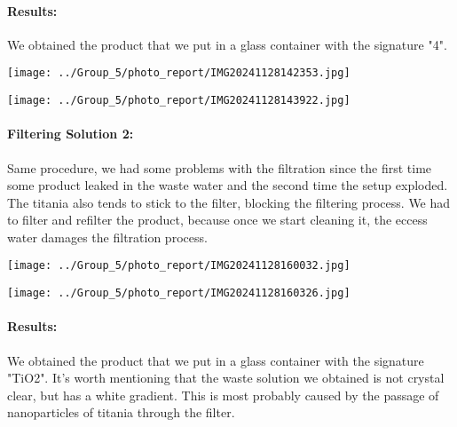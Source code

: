 \newpage

\paragraph{Results: } We obtained the product that we put in a glass container with the signature "4".

\vspace{10pt}

\begin{minipage}{0.48\textwidth}
    \centering
    \texttt{[image: ../Group\_5/photo\_report/IMG20241128142353.jpg]}
\end{minipage}%
\begin{minipage}{0.48\textwidth}
    \centering
    \texttt{[image: ../Group\_5/photo\_report/IMG20241128143922.jpg]}
\end{minipage}

\paragraph{Filtering Solution 2:}

Same procedure, we had some problems with the filtration since the first time some product leaked in the waste water and the second time the setup exploded. The titania also tends to stick to the filter, blocking the filtering process. We had to filter and refilter the product, because once we start cleaning it, the eccess water damages the filtration process.

\vspace{10pt}

\begin{minipage}{0.48\textwidth}
    \centering
    \texttt{[image: ../Group\_5/photo\_report/IMG20241128160032.jpg]}
\end{minipage}%
\begin{minipage}{0.48\textwidth}
    \centering
    \texttt{[image: ../Group\_5/photo\_report/IMG20241128160326.jpg]}
\end{minipage}

\paragraph{Results: } We obtained the product that we put in a glass container with the signature "TiO2". It's worth mentioning that the waste solution we obtained is not crystal clear, but has a white gradient. This is most probably caused by the passage of nanoparticles of titania through the filter.

